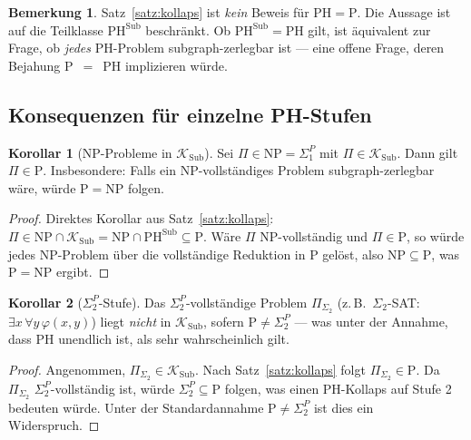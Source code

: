 ﻿\documentclass[a4paper,12pt]{article}
\theoremstyle{definition}
\newtheorem{bemerkung}{Bemerkung}
\newtheorem{korollar}{Korollar}
\begin{document}
\begin{bemerkung}
  Satz~\ref{satz:kollaps} ist \emph{kein} Beweis für $\mathrm{PH} = \mathrm{P}$.
  Die Aussage ist auf die Teilklasse $\mathrm{PH}^{\mathrm{Sub}}$ beschränkt.
  Ob $\mathrm{PH}^{\mathrm{Sub}} = \mathrm{PH}$ gilt, ist äquivalent zur Frage,
  ob \emph{jedes} PH-Problem subgraph-zerlegbar ist --- eine offene Frage,
  deren Bejahung P~$=$~PH implizieren würde.
\end{bemerkung}

\subsection{Konsequenzen für einzelne PH-Stufen}

\begin{korollar}[NP-Probleme in $\mathcal{K}_\mathrm{Sub}$]
\label{kor:np}
  Sei $\Pi \in \mathrm{NP} = \Sigma_1^P$ mit $\Pi \in \mathcal{K}_\mathrm{Sub}$.
  Dann gilt $\Pi \in \mathrm{P}$.
  Insbesondere: Falls ein NP-vollständiges Problem subgraph-zerlegbar wäre,
  würde $\mathrm{P} = \mathrm{NP}$ folgen.
\end{korollar}

\begin{proof}
  Direktes Korollar aus Satz~\ref{satz:kollaps}: $\Pi \in \mathrm{NP} \cap \mathcal{K}_\mathrm{Sub}
  = \mathrm{NP} \cap \mathrm{PH}^{\mathrm{Sub}} \subseteq \mathrm{P}$.
  Wäre $\Pi$ NP-vollständig und $\Pi \in \mathrm{P}$, so würde jedes NP-Problem
  über die vollständige Reduktion in P gelöst, also $\mathrm{NP} \subseteq \mathrm{P}$,
  was $\mathrm{P} = \mathrm{NP}$ ergibt.
\end{proof}

\begin{korollar}[$\Sigma_2^P$-Stufe]
\label{kor:sigma2}
  Das $\Sigma_2^P$-vollständige Problem $\Pi_{\Sigma_2}$ (z.\,B.\ $\Sigma_2$-SAT:
  $\exists x\, \forall y\, \varphi(x,y)$) liegt \emph{nicht} in $\mathcal{K}_\mathrm{Sub}$,
  sofern $\mathrm{P} \neq \Sigma_2^P$ --- was unter der Annahme, dass PH unendlich ist,
  als sehr wahrscheinlich gilt.
\end{korollar}

\begin{proof}
  Angenommen, $\Pi_{\Sigma_2} \in \mathcal{K}_\mathrm{Sub}$.
  Nach Satz~\ref{satz:kollaps} folgt $\Pi_{\Sigma_2} \in \mathrm{P}$.
  Da $\Pi_{\Sigma_2}$ $\Sigma_2^P$-vollständig ist, würde $\Sigma_2^P \subseteq \mathrm{P}$
  folgen, was einen PH-Kollaps auf Stufe 2 bedeuten würde.
  Unter der Standardannahme $\mathrm{P} \neq \Sigma_2^P$ ist dies ein Widerspruch.
\end{proof}
\end{document}
